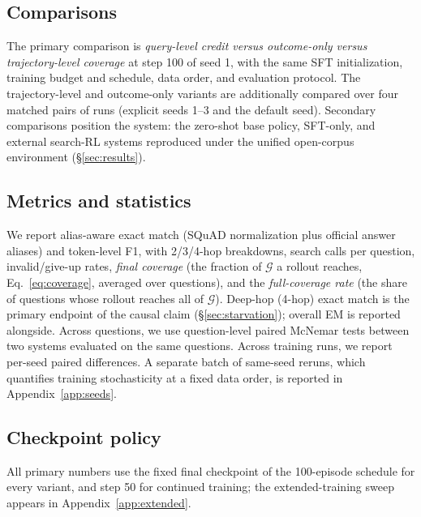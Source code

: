 \subsection{Comparisons}
\label{sec:setup-comparisons}

The primary comparison is \emph{query-level credit versus outcome-only
versus trajectory-level coverage} at step 100 of seed 1, with the same
SFT initialization, training budget and schedule, data order, and
evaluation protocol. The trajectory-level and outcome-only variants are
additionally compared over four matched pairs of runs (explicit seeds
1--3 and the default seed). Secondary comparisons position the system:
the zero-shot base policy, SFT-only, and external search-RL systems
reproduced under the unified open-corpus environment
(\S\ref{sec:results}).

\subsection{Metrics and statistics}
\label{sec:setup-metrics}

We report alias-aware exact match (SQuAD normalization plus official
answer aliases) and token-level F1, with 2/3/4-hop breakdowns, search
calls per question, invalid/give-up rates, \emph{final coverage} (the
fraction of $\mathcal{G}$ a rollout reaches, Eq.~\ref{eq:coverage},
averaged over questions), and the \emph{full-coverage rate} (the share
of questions whose rollout reaches all of $\mathcal{G}$). Deep-hop
(4-hop) exact match is the primary endpoint of the causal claim
(\S\ref{sec:starvation}); overall EM is reported alongside. Across
questions, we use question-level paired McNemar tests between two
systems evaluated on the same questions. Across training runs, we
report per-seed paired differences. A separate batch of same-seed
reruns, which quantifies training stochasticity at a fixed data order,
is reported in Appendix~\ref{app:seeds}.

\subsection{Checkpoint policy}
\label{sec:setup-checkpoint}

All primary numbers use the fixed final checkpoint of the 100-episode
schedule for every variant, and step 50 for continued training; the
extended-training sweep appears in Appendix~\ref{app:extended}.


